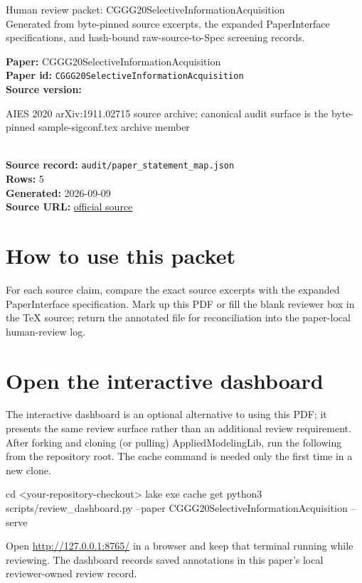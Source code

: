 \documentclass[10pt]{article}
\begin{document}
\fontsize{9}{10}\selectfont

\begin{center}
{\LARGE Human review packet: CGGG20SelectiveInformationAcquisition}\\[0.35em]
\small Generated from byte-pinned source excerpts, the expanded PaperInterface
specifications, and hash-bound raw-source-to-Spec screening records.
\end{center}

\noindent\textbf{Paper:} CGGG20SelectiveInformationAcquisition\\
\textbf{Paper id:} \texttt{CGGG20SelectiveInformationAcquisition}\\
\textbf{Source version:} \parbox[t]{0.76\linewidth}{\raggedright AIES 2020 arXiv:1911.02715 source archive; canonical audit surface is the byte-pinned sample-sigconf.tex archive member}\\
\textbf{Source record:} \texttt{audit/paper\_statement\_map.json}\\
\textbf{Rows:} 5\\
\textbf{Generated:} 2026-09-09\\
\textbf{Source URL:} \href{https://arxiv.org/abs/1911.02715}{official source}





\section*{How to use this packet}
For each source claim, compare the exact source excerpts with the expanded
PaperInterface specification. Mark up this PDF or fill the blank reviewer box in the TeX source;
return the annotated file for reconciliation into the paper-local human-review
log.

\section*{Open the interactive dashboard}
The interactive dashboard is an optional alternative to using this PDF; it
presents the same review surface rather than an additional review requirement.
After forking and cloning (or pulling) AppliedModelingLib, run the following from the
repository root. The cache command is needed only the first time in a new clone.
\begin{ReviewVerbatim}
cd <your-repository-checkout>
lake exe cache get
python3 scripts/review_dashboard.py --paper CGGG20SelectiveInformationAcquisition --serve
\end{ReviewVerbatim}
Open \url{http://127.0.0.1:8765/} in a browser and keep that terminal running
while reviewing. The dashboard records saved annotations in this paper's local
reviewer-owned review record.
\end{document}

